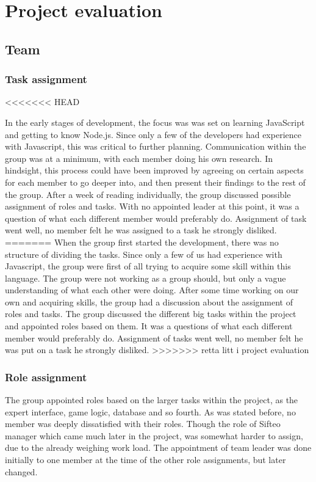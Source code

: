 \chapter{Project evaluation}

\section{Team}

\subsection*{Task assignment}
<<<<<<< HEAD

In the early stages of development, the focus was was set on learning JavaScript and getting to know Node.js. Since only a few of the developers had experience with Javascript, this was critical to further planning. Communication within the group was at a minimum, with each member doing his own research. In hindsight, this process could have been improved by agreeing on certain aspects for each member to go deeper into, and then present their findings to the rest of the group. After a week of reading individually, the group discussed possible assignment of roles and tasks. With no appointed leader at this point, it was a question of what each different member would preferably do. Assignment of task went well, no member felt he was assigned to a task he strongly disliked.
=======
When the group first started the development, there was no structure of dividing the tasks. Since only a few of us had experience with Javascript, the group were first of all trying to acquire some skill within this language. The group were not working as a group should, but only a vague understanding of what each other were doing. After some time working on our own and acquiring skills, the group had a discussion about the assignment of roles and tasks. The group discussed the different big tasks within the project and appointed roles based on them. It was a questions of what each different member would preferably do. Assignment of tasks went well, no member felt he was put on a task he strongly disliked.
>>>>>>> retta litt i project evaluation

\subsection*{Role assignment}

The group appointed roles based on the larger tasks within the project, as the expert interface, game logic, database and so fourth. As was stated before, no member was deeply dissatisfied with their roles. Though the role of Sifteo manager which came much later in the project, was somewhat harder to assign, due to the already weighing work load. The appointment of team leader was done initially to one member at the time of the other role assignments, but later changed. 

